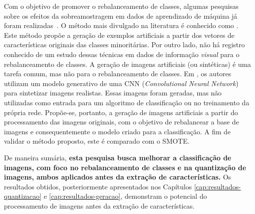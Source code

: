 Com o objetivo de promover o rebalanceamento de classes, algumas pesquisas sobre os efeitos da sobreamostragem em dados de aprendizado de máquina já foram realizadas~\cite{Kuncheva2004,Chawla2002}. O método mais divulgado na literatura é conhecido como . Este método propõe a geração de exemplos artificiais a partir dos vetores de características originais das classes minoritárias. Por outro lado, não há registro conhecido de um estudo dessas técnicas em dados de informação \emph{visual} para o rebalanceamento de classes. A geração de imagens artificiais (ou sintéticas) é uma tarefa comum, mas não para o rebalanceamento de classes. Em , os autores utilizam um modelo generativo de uma CNN (\textit{Convolutional Neural Network}) para sintetizar imagens realistas. Essas imagens foram geradas, mas não utilizadas como entrada para um algoritmo de classificação ou no treinamento da própria rede. Propõe-se, portanto, a geração de imagens artificiais a partir do processamento das imagens originais, com o objetivo de rebalancear a base de imagens e consequentemente o modelo criado para a classificação. A fim de validar o método proposto, este é comparado com o SMOTE.

De maneira sumária, \textbf{esta pesquisa busca melhorar a classificação de imagens, com foco no rebalanceamento de classes e na quantização de imagens, ambos aplicados antes da extração de características.} Os resultados obtidos, posteriormente apresentados nos Capítulos \ref{cap:resultados-quantizacao} e \ref{cap:resultados-geracao}, demonstram o potencial do processamento de imagens antes da extração de características.


